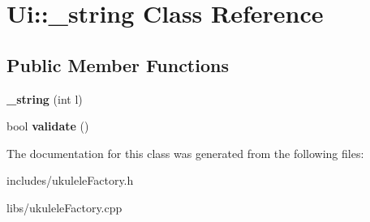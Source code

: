 \hypertarget{class_ui_1_1__string}{}\section{Ui\+:\+:\+\_\+string Class Reference}
\label{class_ui_1_1__string}
\subsection*{Public Member Functions}
\begin{DoxyCompactItemize}
\item 
\hypertarget{class_ui_1_1__string_a803cea6abfcb73f78c1844a63feb21db}{}\label{class_ui_1_1__string_a803cea6abfcb73f78c1844a63feb21db} 
{\bfseries \+\_\+string} (int l)
\item 
\hypertarget{class_ui_1_1__string_ae4521ca840ebf069efa7132c14e16366}{}\label{class_ui_1_1__string_ae4521ca840ebf069efa7132c14e16366} 
bool {\bfseries validate} ()
\end{DoxyCompactItemize}


The documentation for this class was generated from the following files\+:\begin{DoxyCompactItemize}
\item 
includes/ukulele\+Factory.\+h\item 
libs/ukulele\+Factory.\+cpp\end{DoxyCompactItemize}
